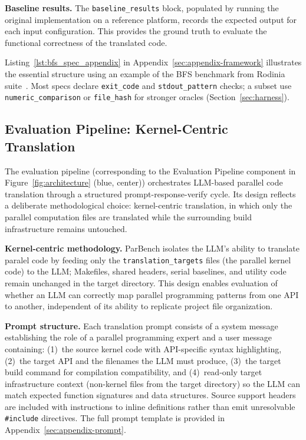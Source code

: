 \textbf{Baseline results.} The \texttt{baseline\_results} block, populated by running the original implementation on a reference platform, records the expected output for each input configuration. This provides the ground truth to evaluate the functional correctness of the translated code.

Listing~\ref{lst:bfs_spec_appendix} in Appendix~\ref{sec:appendix-framework} illustrates the essential structure using an example of the BFS benchmark from Rodinia suite~\cite{Rodinia2009}. Most specs declare 
\texttt{exit\_code} and \texttt{stdout\_pattern} checks; a subset use 
\texttt{numeric\_comparison} or \texttt{file\_hash} for stronger oracles 
(Section~\ref{sec:harness}).


\subsection{Evaluation Pipeline: Kernel-Centric Translation}
\label{sec:eval-pipeline}

The evaluation pipeline (corresponding to the Evaluation Pipeline component in Figure~\ref{fig:architecture} (blue, center)) orchestrates LLM-based parallel code translation through a structured prompt-response-verify cycle. Its design reflects a deliberate methodological choice: kernel-centric translation, in which only the parallel computation files are translated while the surrounding build infrastructure remains untouched.

\textbf{Kernel-centric methodology.} ParBench isolates the LLM's ability to translate paralel code by feeding only the \texttt{translation\_targets} files (the parallel kernel code) to the LLM; Makefiles, shared headers, serial baselines, and utility code remain unchanged in the target directory. This design enables evaluation of whether an LLM can correctly map parallel programming patterns from one API to another, independent of its ability to replicate project file organization.

\textbf{Prompt structure.} Each translation prompt consists of a system message establishing the role of a parallel programming expert and a user message containing: (1)~the source kernel code with API-specific syntax highlighting, (2)~the target API and the filenames the LLM must produce, (3)~the target build command for compilation compatibility, and (4)~read-only target infrastructure context (non-kernel files from the target directory) so the LLM can match expected function signatures and data structures. Source support headers are included with instructions to inline definitions rather than emit unresolvable \texttt{\#include} directives. The full prompt template is provided in Appendix~\ref{sec:appendix-prompt}.

